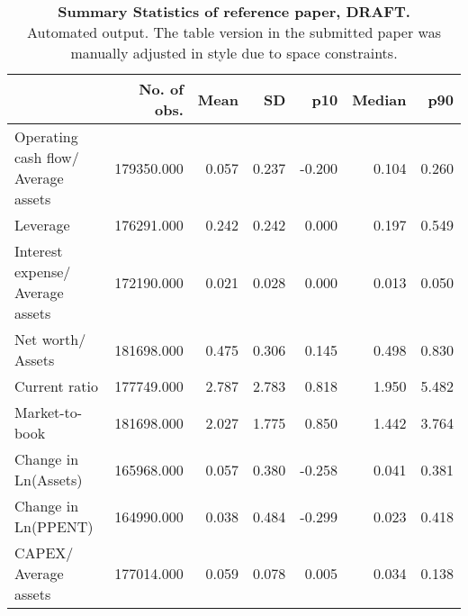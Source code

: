 \begin{table}[ht]
\centering
\caption{\textbf{Summary Statistics of reference paper, DRAFT.} \\
                     Automated output. The table version in the submitted paper 
                     was manually adjusted in style due to space constraints.} 
\begin{tabular}{lrrrrrr}
  \hline
 & No. of obs. & Mean & SD & p10 & Median & p90 \\ 
  \hline
Operating cash flow/ Average assets & 179350.000 & 0.057 & 0.237 & -0.200 & 0.104 & 0.260 \\ 
  Leverage & 176291.000 & 0.242 & 0.242 & 0.000 & 0.197 & 0.549 \\ 
  Interest expense/ Average assets & 172190.000 & 0.021 & 0.028 & 0.000 & 0.013 & 0.050 \\ 
  Net worth/ Assets & 181698.000 & 0.475 & 0.306 & 0.145 & 0.498 & 0.830 \\ 
  Current ratio & 177749.000 & 2.787 & 2.783 & 0.818 & 1.950 & 5.482 \\ 
  Market-to-book & 181698.000 & 2.027 & 1.775 & 0.850 & 1.442 & 3.764 \\ 
  Change in Ln(Assets) & 165968.000 & 0.057 & 0.380 & -0.258 & 0.041 & 0.381 \\ 
  Change in Ln(PPENT) & 164990.000 & 0.038 & 0.484 & -0.299 & 0.023 & 0.418 \\ 
  CAPEX/ Average assets & 177014.000 & 0.059 & 0.078 & 0.005 & 0.034 & 0.138 \\ 
   \hline
\end{tabular}
\end{table}
